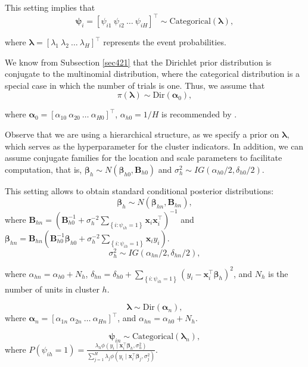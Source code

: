 This setting implies that  
\[
\boldsymbol{\psi}_i = [\psi_{i1} \  \psi_{i2} \ \dots \ \psi_{iH}]^{\top} \sim \text{Categorical}(\boldsymbol{\lambda}),
\] 
  
where \( \boldsymbol{\lambda} = [\lambda_1 \  \lambda_2 \  \dots \ \lambda_H]^{\top} \) represents the event probabilities.

We know from Subsection \ref{sec421} that the Dirichlet prior distribution is conjugate to the multinomial distribution, where the categorical distribution is a special case in which the number of trials is one. Thus, we assume that  
\[
\pi(\boldsymbol{\lambda}) \sim \text{Dir}(\boldsymbol{\alpha}_0),
\]  

where \( \boldsymbol{\alpha}_0 = [\alpha_{10} \ \alpha_{20} \ \dots \ \alpha_{H0}]^{\top} \), $\alpha_{h0}=1/H$ is recommended by \cite[p.~535]{gelman2021bayesian}.  

Observe that we are using a hierarchical structure, as we specify a prior on \( \boldsymbol{\lambda} \), which serves as the hyperparameter for the cluster indicators. In addition, we can assume conjugate families for the location and scale parameters to facilitate computation, that is, $\boldsymbol \beta_h\sim N(\boldsymbol{\beta}_{h0},\boldsymbol{B}_{h0})$ and $\sigma_h^2\sim IG(\alpha_{h0}/2,\delta_{h0}/2)$.

This setting allows to obtain standard conditional posterior distributions: $$\boldsymbol{\beta}_{h}\sim N(\boldsymbol{\beta}_{hn},\boldsymbol{B}_{hn}),$$ where $\boldsymbol{B}_{hn}=(\boldsymbol{B}_{h0}^{-1}+\sigma_h^{-2}\sum_{\left\{i:  \psi_{ih}=1\right\}}\boldsymbol{x}_i\boldsymbol{x}_i^{\top})^{-1}$ and $\boldsymbol{\beta}_{hn}=\boldsymbol{B}_{hn}(\boldsymbol{B}_{h0}^{-1}\boldsymbol{\beta}_{h0}+\sigma_h^{-2}\sum_{\left\{i:  \psi_{ih}=1\right\}}\boldsymbol{x}_iy_i)$.
$$\sigma_h^2\sim IG(\alpha_{hn}/2,\delta_{hn}/2),$$

where $\alpha_{hn}=\alpha_{h0}+N_h$, $\delta_{hn}=\delta_{h0}+\sum_{\left\{i:  \psi_{ih}=1\right\}}(y_i-\boldsymbol{x}_i^{\top}\boldsymbol{\beta}_h)^2$, and $N_h$ is the number of units in cluster $h$.

$$\boldsymbol{\lambda}\sim \text{Dir}(\boldsymbol{\alpha}_n),$$   
where $\boldsymbol{\alpha}_n=[\alpha_{1n} \  \alpha_{2n} \ \dots \ \alpha_{Hn}]^{\top}$, and $\alpha_{hn}=\alpha_{h0}+N_h$.

$$\boldsymbol{\psi}_{in}\sim \text{Categorical}(\boldsymbol{\lambda}_n),$$
where $P(\psi_{ih}=1)=\frac{\lambda_{h}\phi(y_i \mid \boldsymbol{x}_i^{\top}\boldsymbol{\beta}_h,\sigma_h^2)}{\sum_{j=1}^H\lambda_{j}\phi(y_i \mid \boldsymbol{x}_i^{\top}\boldsymbol{\beta}_j,\sigma_j^2)}$.

